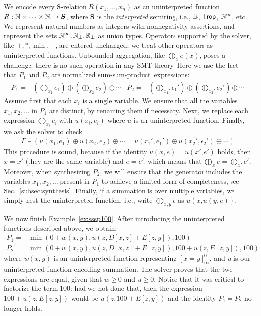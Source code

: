 We encode every $\bm S$-relation
$R(x_1, \dots, x_n)$ as an uninterpreted function
$R : \mathbb N \times \cdots \times \mathbb N \rightarrow \bm S$, where $\bm S$ is
the {\em interpreted} semiring, i.e., $\mathbb B$, $\text{\sf Trop}$, $\mathbb N^\infty$, etc.
We represent natural numbers as
integers with nonnegativity assertions, and represent
the sets $\mathbb N^\infty, \mathbb N_\bot, \mathbb R_\bot$ as union types.
Operators supported by the solver, like $+, *, \min, -$,
are entered unchanged; we treat other operators
as uninterpreted functions.  Unbounded aggregation, like
$\bigoplus_{x} e(x)$, poses a challenge:  there is no
such  operation in any SMT theory.
Here we use the fact that $P_1$ and $P_2$ are normalized
sum-sum-product~expressions:
%
\begin{align*}
P_1 = & \left(\bigoplus_{x_1} e_1\right) \oplus \left(\bigoplus_{x_2}  e_2\right) \oplus \cdots
&
P_2 = & \left(\bigoplus_{x_1'} e_1'\right) \oplus \left(\bigoplus_{x_2'} e_2'\right) \oplus \cdots
\end{align*}
%
Assume first that each $x_i$ is a single variable. We
ensure that all the variables $x_1, x_2, \ldots$ in $P_1$ are
distinct, by renaming them if necessary.  Next, we replace each
expression $\bigoplus_{x_i} e_i$ with $u(x_i,e_i)$ where $u$ is an
uninterpreted function.  Finally, we ask the solver to check
%
\begin{align}
\Gamma \models \left(u(x_1,e_1) \oplus u(x_2,e_2) \oplus \cdots =  u(x_1',e_1') \oplus u(x_2',e_2') \oplus \cdots\right)
\nonumber
\end{align}
%
This procedure is sound, because if the identity $u(x,e) = u(x',e')$
holds, then $x=x'$ (they are the same variable) and $e=e'$, which
means that $\bigoplus_x e = \bigoplus_{x'} e'$.  Moreover,
when synthesizing $P_2$, we will
ensure that the generator includes the variables $x_1, x_2, \ldots$
present in $P_1$ to achieve a limited form of completeness,
see
Sec.~\ref{subsec:synthesis}. Finally, if a
summation is over multiple variables, we simply nest the uninterpreted
function, i.e., write $\bigoplus_{x,y} e$ as $u(x,u(y,e))$.

\begin{ex}  We now finish Example~\ref{ex:sssp100}.
After introducing the
  uninterpreted functions described above, we obtain:
%
  \begin{align*}
    P_1 = & \min(0+w(x,y), u(z,D[x,z]+E[z,y]), 100) \\
    P_2 = & \min(0+w(x,y), u(z,D[x,z]+E[z,y]), 100+u(z,E[z,y]), 100)
  \end{align*}
  where $w(x,y)$ is an uninterpreted function representing
  $[x=y]_\infty^0$, and $u$ is our uninterpreted function encoding
  summation.  The solver proves that the two expressions are equal,
  given that $w \geq 0$ and $u \geq 0$.  Notice that it was critical
  to factorize the term 100: had we not done that, then the expression
  $100+u(z,E[z,y])$ would be $u(z,100 + E[z,y])$ and the identity
  $P_1=P_2$ no longer holds.
\end{ex}

